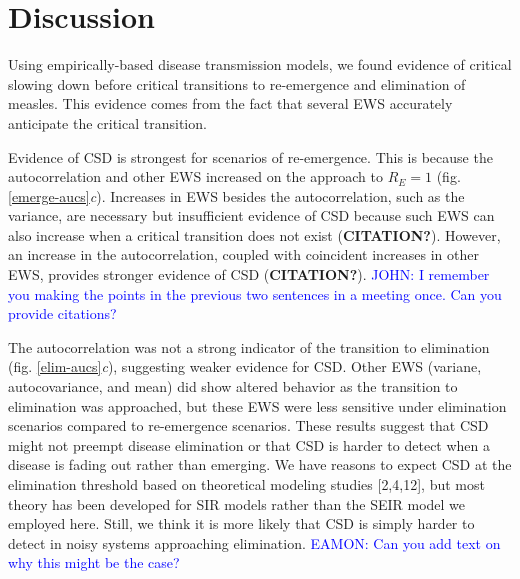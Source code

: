 \documentclass[3p]{elsarticle} %
\begin{document}
\hypertarget{discussion}{%
\section{Discussion}\label{discussion}}

Using empirically-based disease transmission models, we found evidence
of critical slowing down before critical transitions to re-emergence and
elimination of measles. This evidence comes from the fact that several
EWS accurately anticipate the critical transition.

Evidence of CSD is strongest for scenarios of re-emergence. This is
because the autocorrelation and other EWS increased on the approach to
\(R_E = 1\) (fig. \ref{emerge-aucs}\emph{c}). Increases in EWS besides
the autocorrelation, such as the variance, are necessary but
insufficient evidence of CSD because such EWS can also increase when a
critical transition does not exist (\textbf{CITATION?}). However, an
increase in the autocorrelation, coupled with coincident increases in
other EWS, provides stronger evidence of CSD (\textbf{CITATION?}).
\textcolor{blue}{JOHN: I remember you making the points in the previous two sentences in a meeting once. Can you provide citations?}

The autocorrelation was not a strong indicator of the transition to
elimination (fig. \ref{elim-aucs}\emph{c}), suggesting weaker evidence
for CSD. \ignorespaces Other EWS (variane, autocovariance, and mean) did
show altered behavior as the transition to elimination was approached,
but these EWS were less sensitive under elimination scenarios compared
to re-emergence scenarios. These results suggest that CSD might not
preempt disease elimination or that CSD is harder to detect when a
disease is fading out rather than emerging. We have reasons to expect
CSD at the elimination threshold based on theoretical modeling studies
{[}2,4,12{]}, but most theory has been developed for SIR models rather
than the SEIR model we employed here. Still, we think it is more likely
that CSD is simply harder to detect in noisy systems approaching
elimination.
\textcolor{blue}{EAMON: Can you add text on why this might be the case?}
\ignorespaces
\end{document}
